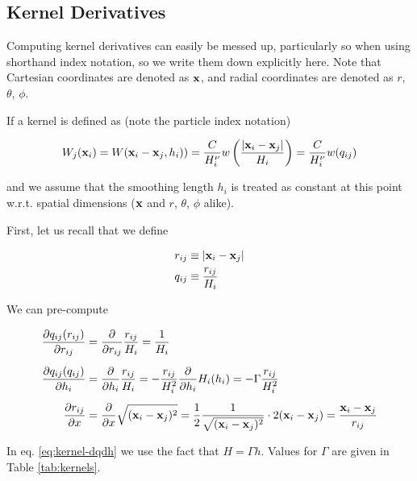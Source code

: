 






\subsection{Kernel Derivatives}

Computing kernel derivatives can easily be messed up, particularly so when using shorthand index notation, so we write them down explicitly here.
Note that Cartesian coordinates are denoted as $\mathbf{x}$, and radial coordinates are denoted as $r$, $\theta$, $\phi$.

If a kernel is defined as (note the particle index notation)

\begin{align}
	W_j(\mathbf{x}_i)	 = W(\mathbf{x}_i - \mathbf{x}_j, h_i))
				 = \frac{C}{H_i^\nu} w \left(\frac{| \mathbf{x}_i - \mathbf{x}_j |}{H_i} \right)
				 =  \frac{C}{H_i^\nu} w ( q_{ij} )
\end{align}


and we assume that the smoothing length $h_i$ is treated as constant at this point w.r.t. spatial dimensions ($\mathbf{x}$ and $r$, $\theta$, $\phi$ alike).


First, let us recall that we define

\begin{align}
	r_{ij} &\equiv |\mathbf{x}_i - \mathbf{x}_j| \\
	q_{ij} &\equiv \frac{r_{ij}}{H_i}
\end{align}

We can pre-compute

\begin{align}
	\frac{\partial q_{ij}(r_{ij})}{\partial r_{ij}} 	
			&= \frac{\partial}{\partial r_{ij}} \frac{r_{ij}}{H_i} = \frac{1}{H_i}		\label{eq:kernel-dqdr} \\[.5em]
	\frac{\partial q_{ij}(q_{ij})}{\partial h_{i}} 	
			&= \frac{\partial}{\partial h_{i}} \frac{r_{ij}}{H_i} = -\frac{r_{ij}}{H_i^2} \frac{\partial}{\partial h_{i}} H_i(h_i) = - \Gamma \frac{r_{ij}}{H_i^2}	\label{eq:kernel-dqdh} \\[.5em]
	\frac{\partial r_{ij}}{\partial x}		
			&= \frac{\partial}{\partial x} \sqrt{(\mathbf{x}_i - \mathbf{x}_j)^2}
			= \frac{1}{2} \frac{1}{\sqrt{(\mathbf{x}_i - \mathbf{x}_j)^2}} \cdot 2 (\mathbf{x}_i - \mathbf{x}_j) = \frac{\mathbf{x}_i - \mathbf{x}_j}{r_{ij}} 	\label{eq:kernel-drdx}
\end{align}

In eq. \ref{eq:kernel-dqdh} we use the fact that $H = \Gamma h$.
Values for $\Gamma$ are given in Table \ref{tab:kernels}.


